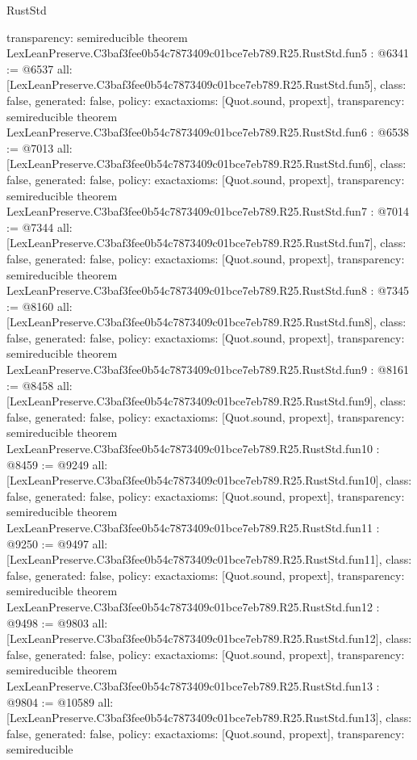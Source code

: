 \begin{lexlean}{RustStd}
\begin{coremodule}
{  transparency: semireducible
}
theorem LexLeanPreserve.C3baf3fee0b54c7873409c01bce7eb789.R25.RustStd.fun5 : @6341 := @6537 {
  all: [LexLeanPreserve.C3baf3fee0b54c7873409c01bce7eb789.R25.RustStd.fun5],
  class: false,
  generated: false,
  policy: exact{axioms: [Quot.sound, propext]},
  transparency: semireducible
}
theorem LexLeanPreserve.C3baf3fee0b54c7873409c01bce7eb789.R25.RustStd.fun6 : @6538 := @7013 {
  all: [LexLeanPreserve.C3baf3fee0b54c7873409c01bce7eb789.R25.RustStd.fun6],
  class: false,
  generated: false,
  policy: exact{axioms: [Quot.sound, propext]},
  transparency: semireducible
}
theorem LexLeanPreserve.C3baf3fee0b54c7873409c01bce7eb789.R25.RustStd.fun7 : @7014 := @7344 {
  all: [LexLeanPreserve.C3baf3fee0b54c7873409c01bce7eb789.R25.RustStd.fun7],
  class: false,
  generated: false,
  policy: exact{axioms: [Quot.sound, propext]},
  transparency: semireducible
}
theorem LexLeanPreserve.C3baf3fee0b54c7873409c01bce7eb789.R25.RustStd.fun8 : @7345 := @8160 {
  all: [LexLeanPreserve.C3baf3fee0b54c7873409c01bce7eb789.R25.RustStd.fun8],
  class: false,
  generated: false,
  policy: exact{axioms: [Quot.sound, propext]},
  transparency: semireducible
}
theorem LexLeanPreserve.C3baf3fee0b54c7873409c01bce7eb789.R25.RustStd.fun9 : @8161 := @8458 {
  all: [LexLeanPreserve.C3baf3fee0b54c7873409c01bce7eb789.R25.RustStd.fun9],
  class: false,
  generated: false,
  policy: exact{axioms: [Quot.sound, propext]},
  transparency: semireducible
}
theorem LexLeanPreserve.C3baf3fee0b54c7873409c01bce7eb789.R25.RustStd.fun10 : @8459 := @9249 {
  all: [LexLeanPreserve.C3baf3fee0b54c7873409c01bce7eb789.R25.RustStd.fun10],
  class: false,
  generated: false,
  policy: exact{axioms: [Quot.sound, propext]},
  transparency: semireducible
}
theorem LexLeanPreserve.C3baf3fee0b54c7873409c01bce7eb789.R25.RustStd.fun11 : @9250 := @9497 {
  all: [LexLeanPreserve.C3baf3fee0b54c7873409c01bce7eb789.R25.RustStd.fun11],
  class: false,
  generated: false,
  policy: exact{axioms: [Quot.sound, propext]},
  transparency: semireducible
}
theorem LexLeanPreserve.C3baf3fee0b54c7873409c01bce7eb789.R25.RustStd.fun12 : @9498 := @9803 {
  all: [LexLeanPreserve.C3baf3fee0b54c7873409c01bce7eb789.R25.RustStd.fun12],
  class: false,
  generated: false,
  policy: exact{axioms: [Quot.sound, propext]},
  transparency: semireducible
}
theorem LexLeanPreserve.C3baf3fee0b54c7873409c01bce7eb789.R25.RustStd.fun13 : @9804 := @10589 {
  all: [LexLeanPreserve.C3baf3fee0b54c7873409c01bce7eb789.R25.RustStd.fun13],
  class: false,
  generated: false,
  policy: exact{axioms: [Quot.sound, propext]},
  transparency: semireducible
}
\end{coremodule}
\end{lexlean}
